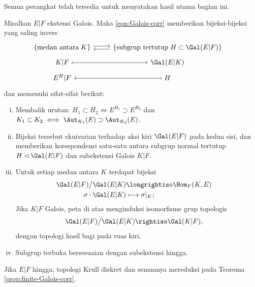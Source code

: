 Semua perangkat telah tersedia untuk menyatakan hasil utama bagian ini.
\begin{theorem}\label{prop:infinite-Galois-corr} 
	Misalkan $E|F$ ekstensi Galois. Maka \eqref{eqn:Galois-corr} memberikan bijeksi-bijeksi yang saling invers
	\[ \begin{tikzcd}[row sep=tiny]
		\left\{ \text{medan antara}\; K  \right\} \arrow[yshift=0.5ex, r] & \left\{\text{subgrup tertutup}\; H \subset \Gal(E|F) \right\} \arrow[yshift=-0.5ex, l] \\
		K|F \arrow[r, mapsto] & \Gal(E|K) \\
		E^H|F & H \arrow[l, mapsto]
	\end{tikzcd}\]
	dan memenuhi sifat-sifat berikut:
	\begin{enumerate}[(i)]
		\item Membalik urutan: $H_1\subset H_2\iff E^{H_1}\supset E^{H_2}$ dan $K_1\subset K_2\iff\Aut_{K_1}(E)\supset\Aut_{K_2}(E)$.
		\item Bijeksi tersebut ekuivarian terhadap aksi kiri $\Gal(E|F)$ pada kedua sisi, dan memberikan korespondensi satu-satu antara subgrup normal tertutup $H\lhd\Gal(E|F)$ dan subekstensi Galois $K|F$.
		\item Untuk setiap medan antara $K$ terdapat bijeksi
			\begin{align*}
				\Gal(E|F)\big/ \Gal(E|K) & \longrightiso \Hom_F(K, E) \\
				\sigma \cdot \Gal(E|K) & \longmapsto \sigma|_K;
			\end{align*}
			Jika $K|F$ Galois, peta di atas menginduksi isomorfisme grup topologis
			\[ \Gal(E|F) \big/ \Gal(E|K) \rightiso \Gal(K|F), \]
			dengan topologi hasil bagi pada ruas kiri.
		\item Subgrup terbuka bersesuaian dengan subekstensi hingga.
	\end{enumerate}
\end{theorem}
Jika $E|F$ hingga, topologi Krull diskret dan semuanya mereduksi pada Teorema \ref{prop:finite-Galois-corr}.
